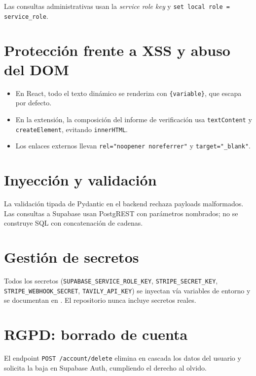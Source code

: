 Las consultas administrativas usan la \emph{service role key} y
\texttt{set local role = service\_role}.

\section{Protección frente a XSS y abuso del DOM}

\begin{itemize}[leftmargin=*,itemsep=0.2em]
  \item En React, todo el texto dinámico se renderiza con
        \texttt{\{variable\}}, que escapa por defecto.
  \item En la extensión, la composición del informe de verificación
        usa \texttt{textContent} y \texttt{createElement}, evitando
        \texttt{innerHTML}.
  \item Los enlaces externos llevan \texttt{rel="noopener noreferrer"}
        y \texttt{target="\_blank"}.
\end{itemize}

\section{Inyección y validación}

La validación tipada de Pydantic en el backend rechaza payloads
malformados. Las consultas a Supabase usan PostgREST con parámetros
nombrados; no se construye SQL con concatenación de cadenas.

\section{Gestión de secretos}

Todos los secretos (\texttt{SUPABASE\_SERVICE\_ROLE\_KEY},
\texttt{STRIPE\_SECRET\_KEY}, \texttt{STRIPE\_WEBHOOK\_SECRET},
\texttt{TAVILY\_API\_KEY}) se inyectan vía variables de entorno y se
documentan en . El repositorio nunca incluye
secretos reales.

\section{RGPD: borrado de cuenta}

El endpoint \texttt{POST /account/delete} elimina en cascada los datos
del usuario y solicita la baja en Supabase Auth, cumpliendo el
derecho al olvido.
